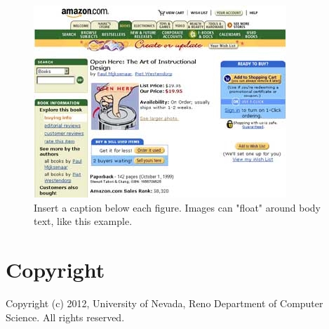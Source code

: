 \documentclass{chi-ext}
\begin{document}
\begin{figure}
\hspace*{-0.4\columnwidth}%
\parbox{1.4\columnwidth}{
  \centering
  \includegraphics[width=\columnwidth]{sample.jpg}
  \caption{Insert a caption below each figure. Images can "float" around body text, like this example.}
  \label{fig:sample}
}
\end{figure}%

\section{Copyright}
Copyright (c) 2012, University of Nevada, Reno Department of Computer Science.
All rights reserved.


\end{document}
